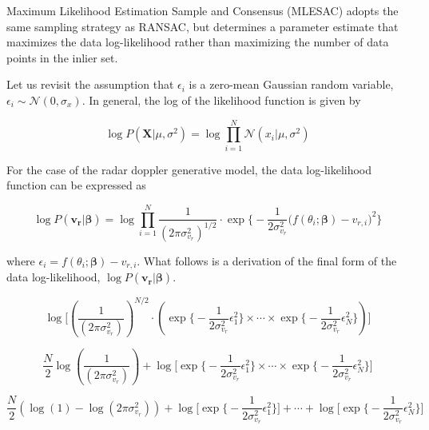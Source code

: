 \documentclass[]{article}
\begin{document}
Maximum Likelihood Estimation Sample and Consensus (MLESAC) \cite{MLESAC} adopts the same sampling strategy as RANSAC, but determines a parameter estimate that maximizes the data log-likelihood rather than maximizing the number of data points in the inlier set.

Let us revisit the assumption that $\epsilon_i$ is a zero-mean Gaussian random variable, $\epsilon_i \sim \mathcal{N}(0,\sigma_x)$. In general, the log of the likelihood function is given by

\begin{equation}
	\log P(\mathbf{X} \vert \mu, \sigma^2) = \log \prod_{i=1}^N \mathcal{N}(x_i \vert \mu, \sigma^2)	
\end{equation}

For the case of the radar doppler generative model, the data log-likelihood function can be expressed as

\begin{equation}
	\log P(\mathbf{v_r} \vert \boldsymbol{\beta}) = \log \prod_{i=1}^N \frac{1}{(2\pi\sigma_{v_r}^2)^{1/2}} \cdot \exp \bigg\lbrace -\frac{1}{2\sigma_{v_r}^2} \big( f(\theta_i;\boldsymbol{\beta}) - v_{r,i} \big)^2 \bigg\rbrace
\end{equation}

where $\epsilon_i = f(\theta_i;\boldsymbol{\beta}) - v_{r,i}$. What follows is a derivation of the final form of the data log-likelihood, $\log P(\mathbf{v_r} \vert \boldsymbol{\beta})$.

\begin{equation}
	\log \bigg\lbrack \left( \frac{1}{(2\pi\sigma_{v_r}^2)} \right)^{N/2} \cdot \left( \exp \bigg\lbrace -\frac{1}{2\sigma_{v_r}^2} \epsilon_1^2 \bigg\rbrace \times \cdots \times \exp \bigg\lbrace -\frac{1}{2\sigma_{v_r}^2} \epsilon_N^2 \bigg\rbrace  \right) \bigg\rbrack
\end{equation}

\begin{equation}
	\frac{N}{2} \log \left( \frac{1}{(2\pi\sigma_{v_r}^2)} \right) + \log \bigg\lbrack \exp \bigg\lbrace -\frac{1}{2\sigma_{v_r}^2} \epsilon_1^2 \bigg\rbrace \times \cdots \times \exp \bigg\lbrace -\frac{1}{2\sigma_{v_r}^2} \epsilon_N^2 \bigg\rbrace \bigg\rbrack
\end{equation}

\begin{equation}
	\frac{N}{2} \left( \log(1) - \log (2\pi\sigma_{v_r}^2) \right) + \log \bigg\lbrack \exp \bigg\lbrace -\frac{1}{2\sigma_{v_r}^2} \epsilon_1^2 \bigg\rbrace \bigg\rbrack + \cdots + \log \bigg\lbrack \exp \bigg\lbrace -\frac{1}{2\sigma_{v_r}^2} \epsilon_N^2 \bigg\rbrace \bigg\rbrack
\end{equation}
\end{document}
